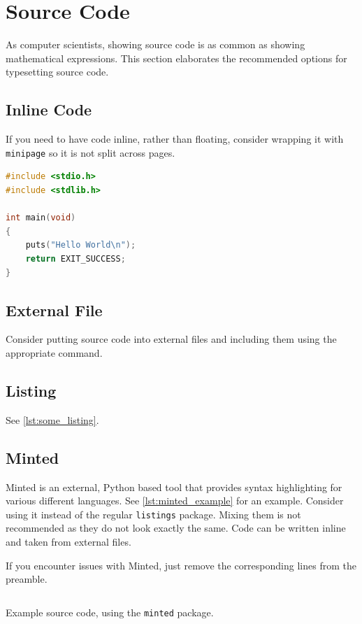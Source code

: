 \section{Source Code}

As computer scientists, showing source code is as common as showing mathematical expressions.
This section elaborates the recommended options for typesetting source code.

\subsection{Inline Code}

If you need to have code inline, rather than floating, consider wrapping it with \texttt{minipage} so it is not split across pages.

\begin{minipage}{0.95\textwidth}
\begin{lstlisting}[language=c]
#include <stdio.h>
#include <stdlib.h>

int main(void)
{
	puts("Hello World\n");
	return EXIT_SUCCESS;
}
\end{lstlisting}
\end{minipage}

\subsection{External File}

Consider putting source code into external files and including them using the appropriate command.

\begin{minipage}{0.95\textwidth}

\end{minipage}

\subsection{Listing}

See \cref{lst:some_listing}.



\subsection{Minted}

Minted is an external, Python based tool that provides syntax highlighting for various different languages.
See \cref{lst:minted_example} for an example.
Consider using it instead of the regular \texttt{listings} package.
Mixing them is not recommended as they do not look exactly the same.
Code can be written inline and taken from external files.

If you encounter issues with Minted, just remove the corresponding lines from the preamble.

\begin{listing}
	\capstart
	\inputminted{haskell}{code/sample.hs}
	\caption{Example source code, using the \texttt{minted} package.}
	\label{lst:minted_example}
\end{listing}
